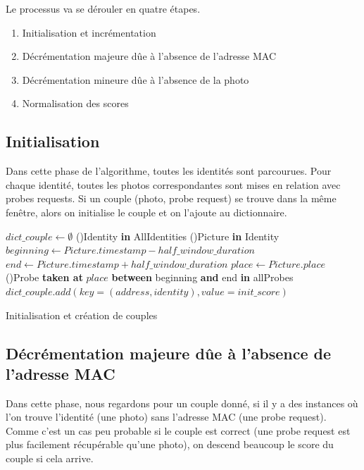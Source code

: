 Le processus va se dérouler en quatre étapes. 
\begin{enumerate}
	\item Initialisation et incrémentation
	\item Décrémentation majeure dûe à l'absence de l'adresse MAC
	\item Décrémentation mineure dûe à l'absence de la photo
	\item Normalisation des scores
\end{enumerate}

\subsection{Initialisation}
Dans cette phase de l'algorithme, toutes les identités sont parcourues.
Pour chaque identité, toutes les photos correspondantes sont mises en relation avec probes requests.
Si un couple (photo, probe request) se trouve dans la même fenêtre, alors on initialise le couple et on l'ajoute au dictionnaire.

\begin{algorithm2e}[H]
	\SetAlgoLined
	$dict\_couple  \gets \emptyset $\;
	\ForEach(){Identity \textbf{in} AllIdentities}{
		 \ForEach(){Picture \textbf{in} Identity}{
			 $beginning \gets Picture.timestamp - half\_window\_duration$\;
			 $end \gets Picture.timestamp + half\_window\_duration$\;
			 $place \gets Picture.place$\;
			 \ForEach(){Probe \textbf{taken at} $place$ \textbf{between} beginning \textbf{and} end \textbf{in} allProbes}{
				$dict\_couple.add(key=(address, identity), value=init\_score)$
			 }
			}
		}
	\caption{Initialisation et création de couples}
\end{algorithm2e}

\subsection{Décrémentation majeure dûe à l'absence de l'adresse MAC}
Dans cette phase, nous regardons pour un couple donné, si il y a des instances où l'on trouve 
l'identité (une photo) sans l'adresse MAC (une probe request). Comme c'est un cas peu probable si le couple
est correct (une probe request est plus facilement récupérable qu'une photo), on descend beaucoup le score du couple si cela arrive.

